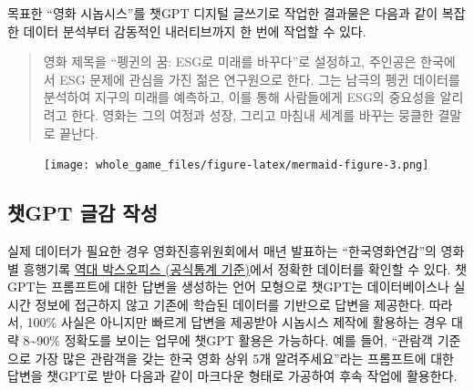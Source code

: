 \documentclass[
  letterpaper,
]{book}
\begin{document}
목표한 ``영화 시놉시스''를 챗GPT 디지털 글쓰기로 작업한 결과물은 다음과
같이 복잡한 데이터 분석부터 감동적인 내러티브까지 한 번에 작업할 수
있다.

\begin{quote}
영화 제목을 ``펭귄의 꿈: ESG로 미래를 바꾸다''로 설정하고, 주인공은
한국에서 ESG 문제에 관심을 가진 젊은 연구원으로 한다. 그는 남극의 펭귄
데이터를 분석하여 지구의 미래를 예측하고, 이를 통해 사람들에게 ESG의
중요성을 알리려고 한다. 영화는 그의 여정과 성장, 그리고 마침내 세계를
바꾸는 뭉클한 결말로 끝난다.
\end{quote}

\begin{figure}[H]

{\centering \texttt{[image: whole\_game\_files/figure-latex/mermaid-figure-3.png]}

}

\end{figure}

\hypertarget{uxcc57gpt-uxae00uxac10-uxc791uxc131}{%
\subsection{챗GPT 글감 작성}\label{uxcc57gpt-uxae00uxac10-uxc791uxc131}}

실제 데이터가 필요한 경우 영화진흥위원회에서 매년 발표하는
``한국영화연감''의 영화별 흥행기록
\href{https://www.kobis.or.kr/kobis/business/stat/offc/findFormerBoxOfficeList.do}{역대
박스오피스 (공식통계 기준)}에서 정확한 데이터를 확인할 수 있다. 챗GPT는
프롬프트에 대한 답변을 생성하는 언어 모형으로 챗GPT는 데이터베이스나
실시간 정보에 접근하지 않고 기존에 학습된 데이터를 기반으로 답변을
제공한다. 따라서, 100\% 사실은 아니지만 빠르게 답변을 제공받아 시놉시스
제작에 활용하는 경우 대략 8\textasciitilde90\% 정확도를 보이는 업무에
챗GPT 활용은 가능하다. 예를 들어, ``관람객 기준으로 가장 많은 관람객을
갖는 한국 영화 상위 5개 알려주세요''라는 프롬프트에 대한 답변을 챗GPT로
받아 다음과 같이 마크다운 형태로 가공하여 후속 작업에 활용한다.
\end{document}
